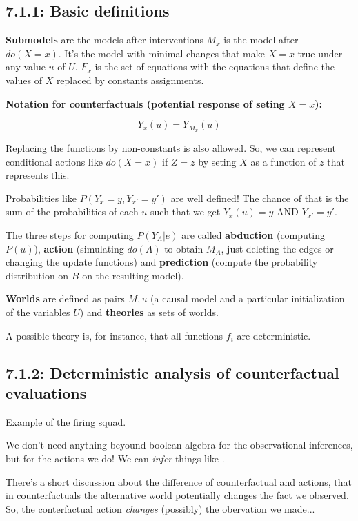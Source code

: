 \subsection{7.1.1: Basic definitions}

\textbf{Submodels} are the models after interventions $M_x$ is the model after $do(X=x)$. It's the model with minimal changes that make $X=x$ true under any value $u$ of $U$. $F_x$ is the set of equations with the equations that define the values of $X$ replaced by constants assignments.

\textbf{Notation for counterfactuals (potential response of seting $X=x$):}

$$Y_x(u) = Y_{M_x}(u)$$

Replacing the functions by non-constants is also allowed. So, we can represent conditional actions like $do(X=x)$ if $Z = z$ by seting $X$ as a function of $z$ that represents this.

Probabilities like $P(Y_x = y, Y_{x'} = y')$ are well defined! The chance of that is the sum of the probabilities of each $u$ such that we get $Y_x(u) = y$ AND $Y_{x'} = y'$.

The three steps for computing $P(Y_A|e)$ are called \textbf{abduction} (computing $P(u)$), \textbf{action} (simulating $do(A)$ to obtain $M_A$, just deleting the edges or changing the update functions) and \textbf{prediction} (compute the probability distribution on $B$ on the resulting model).

\textbf{Worlds} are defined as pairs $M,u$ (a causal model and a particular initialization of the variables $U$) and \textbf{theories} as sets of worlds.

A possible theory is, for instance, that all functions $f_i$ are deterministic.

\subsection{7.1.2: Deterministic analysis of counterfactual evaluations}

Example of the firing squad.

We don't need anything beyound boolean algebra for the observational inferences, but for the actions we do! We can \textit{infer} things like .

There's a short discussion about the difference of counterfactual and actions, that in counterfactuals the alternative world potentially changes the fact we observed. So, the conterfactual action \textit{changes} (possibly) the obervation we made...

